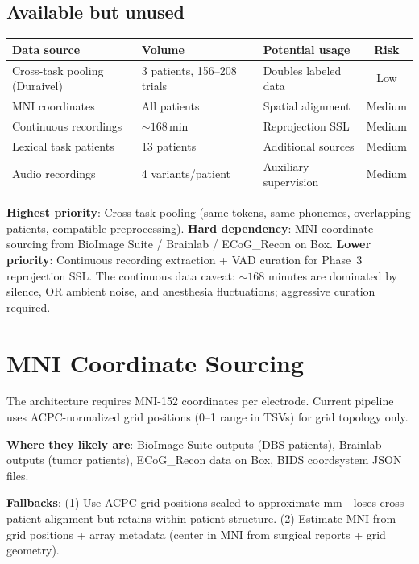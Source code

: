 \documentclass[11pt,letterpaper]{article}
\begin{document}
\subsection{Available but unused}

\begin{table}[h]\centering\small
\begin{tabular}{@{}lllc@{}}
\toprule
\textbf{Data source} & \textbf{Volume} & \textbf{Potential usage} & \textbf{Risk} \\
\midrule
Cross-task pooling (Duraivel) & 3 patients, 156--208 trials & Doubles labeled data & Low \\
MNI coordinates & All patients & Spatial alignment & Medium \\
Continuous recordings & ${\sim}168$\,min & Reprojection SSL & Medium \\
Lexical task patients & 13 patients & Additional sources & Medium \\
Audio recordings & 4 variants/patient & Auxiliary supervision & Medium \\
\bottomrule
\end{tabular}
\end{table}

\textbf{Highest priority}: Cross-task pooling (same tokens, same phonemes, overlapping patients, compatible preprocessing). \textbf{Hard dependency}: MNI coordinate sourcing from BioImage Suite / Brainlab / ECoG\_Recon on Box. \textbf{Lower priority}: Continuous recording extraction + VAD curation for Phase~3 reprojection SSL. The continuous data caveat: ${\sim}168$ minutes are dominated by silence, OR ambient noise, and anesthesia fluctuations; aggressive curation required.


\section{MNI Coordinate Sourcing}

The architecture requires MNI-152 coordinates per electrode. Current pipeline uses ACPC-normalized grid positions (0--1 range in TSVs) for grid topology only.

\textbf{Where they likely are}: BioImage Suite outputs (DBS patients), Brainlab outputs (tumor patients), ECoG\_Recon data on Box, BIDS coordsystem JSON files.

\textbf{Fallbacks}: (1) Use ACPC grid positions scaled to approximate mm---loses cross-patient alignment but retains within-patient structure. (2) Estimate MNI from grid positions + array metadata (center in MNI from surgical reports + grid geometry).
\end{document}
